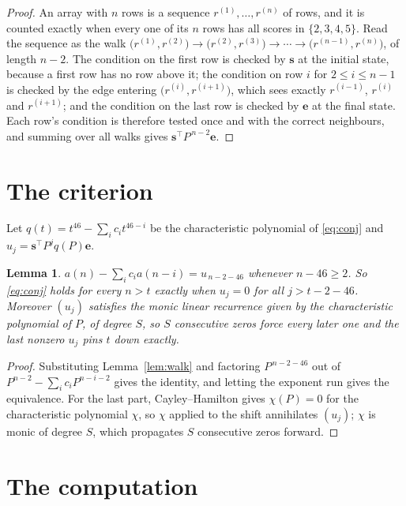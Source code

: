 \documentclass[11pt,a4paper]{article}
\theoremstyle{plain}
\newtheorem{lemma}[theorem]{Lemma}
\theoremstyle{definition}
\begin{document}
\begin{proof}
An array with $n$ rows is a sequence $r^{(1)},\dots,r^{(n)}$ of rows, and it is counted
exactly when every one of its $n$ rows has all scores in $\{2,3,4,5\}$. Read the sequence as the
walk $\bigl(r^{(1)},r^{(2)}\bigr)\to\bigl(r^{(2)},r^{(3)}\bigr)\to\cdots\to
\bigl(r^{(n-1)},r^{(n)}\bigr)$, of length $n-2$. The condition on the first row is
checked by $\mathbf{s}$ at the initial state, because a first row has no row above it; the
condition on row $i$ for $2\le i\le n-1$ is checked by the edge entering
$\bigl(r^{(i)},r^{(i+1)}\bigr)$, which sees exactly $r^{(i-1)}$, $r^{(i)}$ and
$r^{(i+1)}$; and the condition on the last row is checked by $\mathbf{e}$ at the final
state. Each row's condition is therefore tested once and with the correct neighbours, and
summing over all walks gives $\mathbf{s}^{\!\top}P^{\,n-2}\mathbf{e}$.
\end{proof}

\section{The criterion}

Let $q(t)=t^{46}-\sum_i c_i t^{46-i}$ be the characteristic polynomial of
\eqref{eq:conj} and $u_j=\mathbf{s}^{\!\top}P^{j}q(P)\mathbf{e}$.

\begin{lemma}\label{lem:crit}
$a(n)-\sum_i c_i a(n-i)=u_{\,n-2-46}$ whenever $n-46\ge2$. So \eqref{eq:conj}
holds for every $n>t$ exactly when $u_j=0$ for all $j>t-2-46$. Moreover $(u_j)$
satisfies the monic linear recurrence given by the characteristic polynomial of $P$, of
degree $S$, so $S$ consecutive zeros force every later one and the last nonzero $u_j$ pins
$t$ down exactly.
\end{lemma}

\begin{proof}
Substituting Lemma~\ref{lem:walk} and factoring $P^{\,n-2-46}$ out of
$P^{n-2}-\sum_i c_i P^{n-i-2}$ gives the identity, and letting the exponent run gives the
equivalence. For the last part, Cayley--Hamilton gives $\chi(P)=0$ for the characteristic
polynomial $\chi$, so $\chi$ applied to the shift annihilates $(u_j)$; $\chi$ is monic of
degree $S$, which propagates $S$ consecutive zeros forward.
\end{proof}

\section{The computation}
\end{document}
